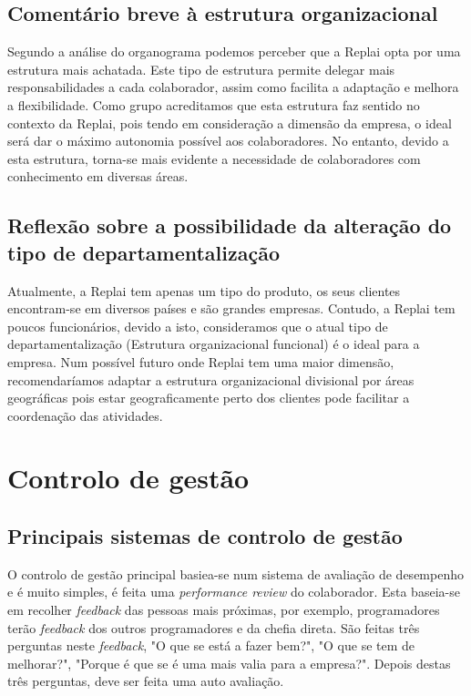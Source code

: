 \subsection{Comentário breve à estrutura organizacional}
Segundo a análise do organograma podemos perceber que a Replai opta por uma estrutura mais achatada. Este tipo de estrutura permite delegar mais responsabilidades a cada colaborador, assim como facilita a adaptação e melhora a flexibilidade. 
Como grupo acreditamos que esta estrutura faz sentido no contexto da Replai, pois tendo em consideração a dimensão da empresa, o ideal será dar o máximo autonomia possível aos colaboradores. No entanto, devido a esta estrutura, torna-se mais evidente a necessidade de colaboradores com conhecimento em diversas áreas. 

\subsection{Reflexão sobre a possibilidade da alteração do tipo de departamentalização}

Atualmente, a Replai tem apenas um tipo do produto, os seus clientes encontram-se em diversos países e são grandes empresas. Contudo, a Replai tem poucos funcionários, devido a isto, consideramos que o atual tipo de departamentalização (Estrutura organizacional funcional) é o ideal para a empresa. Num possível futuro onde Replai tem uma maior dimensão, recomendaríamos adaptar a estrutura organizacional divisional por áreas geográficas pois estar geograficamente perto dos clientes pode facilitar a coordenação das atividades.


\newpage
\section{Controlo de gestão}

\subsection{Principais sistemas de controlo de gestão}

O controlo de gestão principal basiea-se num sistema de avaliação de desempenho e é muito simples, é feita uma \textit{performance review} do colaborador. Esta baseia-se em recolher \textit{feedback} das pessoas mais próximas, por exemplo, programadores terão \textit{feedback} dos outros programadores e da chefia direta. São feitas três perguntas neste \textit{feedback}, "O que se está a fazer bem?", "O que se tem de melhorar?", "Porque é que se é uma mais valia para a empresa?". Depois destas três perguntas, deve ser feita uma auto avaliação. 

